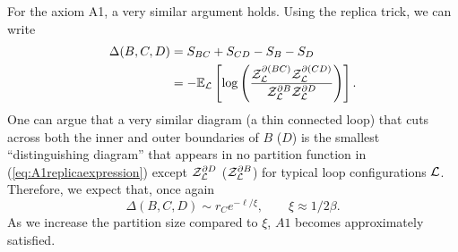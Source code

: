 For the axiom A1, a very similar argument holds. Using the replica trick, we can write 
\begin{subequations}
\begin{align}
    \Delta(B,C,D) &= S_{BC} + S_{CD} - S_B - S_D \\
    &= -\mathbb{E}_{\mathcal{L}}\left[ \log\left( \frac{\mathcal{Z}^{\partial(BC)}_{\mathcal{L}}\mathcal{Z}^{\partial (CD)}_{\mathcal{L}}}{\mathcal{Z}^{\partial B}_{\mathcal{L}} \mathcal{Z}^{\partial D}_{\mathcal{L}}} \right)  \right]. \label{eq:A1replicaexpression}
\end{align}
\end{subequations}
One can argue that a very similar diagram (a thin connected loop) that cuts across both the inner and outer boundaries of $B$ ($D$) is the smallest ``distinguishing diagram'' that appears in no partition function in (\ref{eq:A1replicaexpression}) except $\mathcal{Z}^{\partial D}_{\mathcal{L}}$ ($\mathcal{Z}^{\partial B}_{\mathcal{L}}$) for typical loop configurations $\mathcal{L}$. Therefore, we expect that, once again 
\begin{equation}
    \Delta(B,C,D) \sim r_C e^{-\ell / \xi}, \qquad \xi \approx 1/2\beta.
\end{equation}
As we increase the partition size compared to $\xi$, $A1$ becomes approximately satisfied. 

